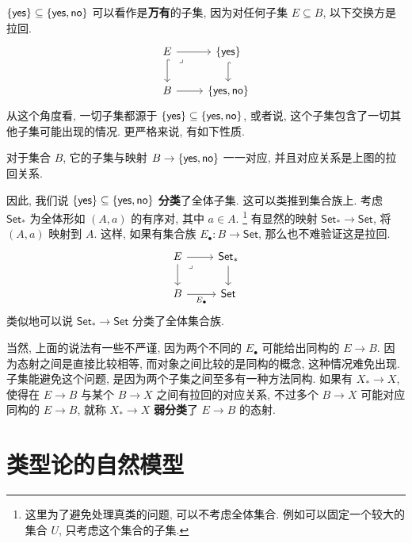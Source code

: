 \(\{\textnormal{\textsf{yes}}\} \subseteq \{\textnormal{\textsf{yes}}, \textnormal{\textsf{no}}\}\)
可以看作是\textbf{万有}的子集, 因为对任何子集 \(E \subseteq B\),
以下交换方是拉回.
\[\begin{tikzcd}
  E & {\{\cons{yes}\}} \\
  B & {\{\cons{yes}, \cons{no}\}}
  \arrow[hook, from=1-1, to=2-1]
  \arrow[hook, from=1-2, to=2-2]
  \arrow[from=1-1, to=1-2]
  \arrow[from=2-1, to=2-2]
  \arrow["\lrcorner"{anchor=center, pos=0.125}, draw=none, from=1-1, to=2-2]
\end{tikzcd}\]
从这个角度看, 一切子集都源于
\(\{\textnormal{\textsf{yes}}\} \subseteq \{\textnormal{\textsf{yes}}, \textnormal{\textsf{no}}\}\),
或者说, 这个子集包含了一切其他子集可能出现的情况.
更严格来说, 有如下性质.
\begin{theorem}
对于集合 \(B\), 它的子集与映射 \(B \to \{\textnormal{\textsf{yes}}, \textnormal{\textsf{no}}\}\)
一一对应, 并且对应关系是上图的拉回关系.
\end{theorem}
因此, 我们说 \(\{\textnormal{\textsf{yes}}\} \subseteq \{\textnormal{\textsf{yes}}, \textnormal{\textsf{no}}\}\)
\textbf{分类}了全体子集.
这可以类推到集合族上.
考虑 \(\mathsf{Set}_*\) 为全体形如
\((A, a)\) 的有序对, 其中 \(a \in A\).%
\footnote{这里为了避免处理真类的问题, 可以不考虑全体集合.
例如可以固定一个较大的集合 \(U\), 只考虑这个集合的子集.}
有显然的映射 \(\mathsf{Set}_* \to \mathsf{Set}\),
将 \((A, a)\) 映射到 \(A\).
这样, 如果有集合族 \(E_\bullet : B \to \mathsf{Set}\),
那么也不难验证这是拉回.
\[\begin{tikzcd}
  E & {\mathsf{Set}_*} \\
  B & {\mathsf{Set}}
  \arrow[from=1-1, to=2-1]
  \arrow[from=1-2, to=2-2]
  \arrow[from=1-1, to=1-2]
  \arrow["{E_\bullet}"', from=2-1, to=2-2]
  \arrow["\lrcorner"{anchor=center, pos=0.125}, draw=none, from=1-1, to=2-2]
\end{tikzcd}\]
类似地可以说 \(\mathsf{Set}_* \to \mathsf{Set}\) 分类了全体集合族.

当然, 上面的说法有一些不严谨, 因为两个不同的 \(E_\bullet\)
可能给出同构的 \(E \to B\). 因为态射之间是直接比较相等,
而对象之间比较的是同构的概念, 这种情况难免出现.
子集能避免这个问题, 是因为两个子集之间至多有一种方法同构.
如果有 \(X_* \to X\), 使得在 \(E \to B\) 与某个
\(B \to X\) 之间有拉回的对应关系,
不过多个 \(B \to X\) 可能对应同构的 \(E \to B\),
就称 \(X_* \to X\) \textbf{弱分类}了 \(E \to B\) 的态射.

\section{类型论的自然模型}\label{category:naturalmodel}


